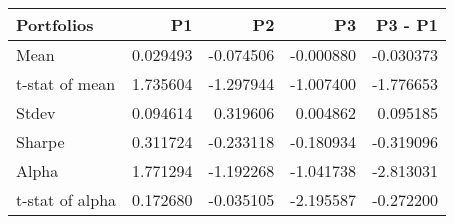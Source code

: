 \begin{tabular}{lrrrr}
\toprule
Portfolios & P1 & P2 & P3 & P3 - P1 \\
\midrule
Mean & 0.029493 & -0.074506 & -0.000880 & -0.030373 \\
t-stat of mean & 1.735604 & -1.297944 & -1.007400 & -1.776653 \\
Stdev & 0.094614 & 0.319606 & 0.004862 & 0.095185 \\
Sharpe & 0.311724 & -0.233118 & -0.180934 & -0.319096 \\
Alpha & 1.771294 & -1.192268 & -1.041738 & -2.813031 \\
t-stat of alpha & 0.172680 & -0.035105 & -2.195587 & -0.272200 \\
\bottomrule
\end{tabular}
